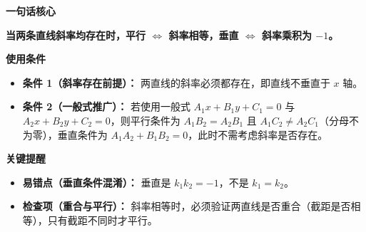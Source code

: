 \begin{summarybox}
	\textbf{\textcolor{CSummary}{一句话核心}}

	\textbf{当两条直线斜率均存在时，平行 $\Longleftrightarrow$ 斜率相等，垂直 $\Longleftrightarrow$ 斜率乘积为 $-1$。}

	\medskip
	\textbf{\textcolor{CSummary}{使用条件}}
	\begin{itemize}[leftmargin=*, itemsep=0.5em, topsep=0.4em]
		\item \textbf{条件 1（斜率存在前提）：} 两直线的斜率必须都存在，即直线不垂直于 $x$ 轴。
		\item \textbf{条件 2（一般式推广）：} 若使用一般式 $A_1x+B_1y+C_1=0$ 与 $A_2x+B_2y+C_2=0$，则平行条件为 $A_1B_2 = A_2B_1$ 且 $A_1C_2 \neq A_2C_1$（分母不为零），垂直条件为 $A_1A_2 + B_1B_2 = 0$，此时不需考虑斜率是否存在。
	\end{itemize}

	\medskip
	\textbf{\textcolor{CSummary}{关键提醒}}
	\begin{itemize}[leftmargin=*, itemsep=0.5em, topsep=0.4em]
		\item \textbf{易错点（垂直条件混淆）：} 垂直是 $k_1k_2=-1$，不是 $k_1=k_2$。
		\item \textbf{检查项（重合与平行）：} 斜率相等时，必须验证两直线是否重合（截距是否相等），只有截距不同时才平行。
	\end{itemize}
\end{summarybox}
